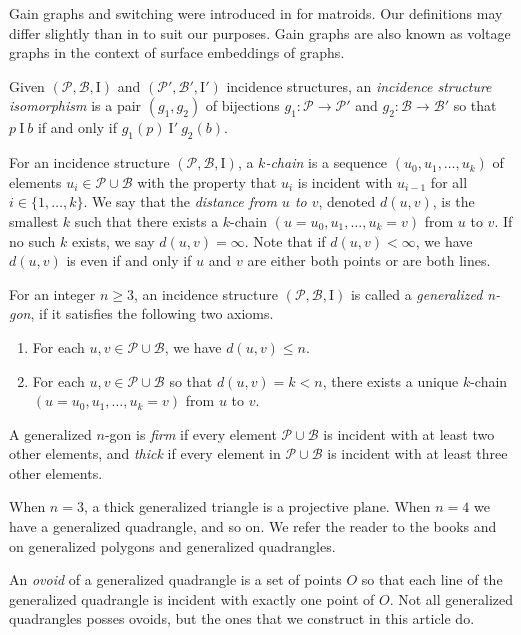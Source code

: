 \documentclass[11pt]{article}
\theoremstyle{definition}
\begin{document}
Gain graphs and switching were introduced in \cite{Zas89} for matroids.  Our definitions may differ slightly than in \cite{Zas89} to suit our purposes.  Gain graphs are also known as voltage graphs in the context of surface embeddings of graphs.

Given $(\mathscr{P},\mathscr{B},\mathrm{I})$ and $(\mathscr{P}',\mathscr{B}',\mathrm{I}')$ incidence structures, an \textit{incidence structure isomorphism} is a pair $(g_1,g_2)$ of bijections $g_1 : \mathscr{P} \rightarrow \mathscr{P}'$ and $g_2 : \mathscr{B} \rightarrow \mathscr{B}'$ so that $p \  \mathrm{I} \  b$ if and only if $g_1(p) \  \mathrm{I}' \  g_2(b)$.

For an incidence structure $(\mathscr{P},\mathscr{B},\mathrm{I})$, a $k$\textit{-chain} is a sequence $(u_0, u_1, \dots, u_k)$ of elements $u_i \in \mathscr{P} \cup \mathscr{B}$ with the property that $u_i$ is incident with $u_{i-1}$ for all $i \in \{1, \dots,  k\}$.  We say that the \textit{distance from $u$ to $v$}, denoted $d(u,v)$, is the smallest $k$ such that there exists a $k$-chain $(u = u_0, u_1, \dots, u_k = v)$ from $u$ to $v$.  If no such $k$ exists, we say $d(u,v) = \infty$.  Note that if $d(u,v) < \infty$, we have $d(u,v)$ is even if and only if $u$ and $v$ are either both points or are both lines.

For an integer $n \geq 3$, an incidence structure $(\mathscr{P},\mathscr{B},\mathrm{I})$ is called a \textit{generalized n-gon}, if it satisfies the following two axioms.
\begin{enumerate}
 \item For each $u,v \in \mathscr{P} \cup \mathscr{B}$, we have $d(u,v) \leq n$.
\item For each $u,v \in \mathscr{P} \cup \mathscr{B}$ so that $d(u,v) = k < n$, there exists a unique $k$-chain $(u = u_0,u_1, \dots , u_k = v)$ from $u$ to $v$.
\end{enumerate}

A generalized $n$-gon is \textit{firm} if every element $\mathscr{P} \cup \mathscr{B}$ is incident with at least two other elements, and \textit{thick} if every element in $\mathscr{P} \cup \mathscr{B}$ is incident with at least three other elements. 

When $n=3$, a thick generalized triangle is a projective plane.  When $n=4$ we have a generalized quadrangle, and so on.   We refer the reader to the books \cite{PolyBook} and \cite{GQBook} on generalized polygons and generalized quadrangles.

An \textit{ovoid} of a generalized quadrangle is a set of points $O$ so that each line of the generalized quadrangle is incident with exactly one point of $O$.  Not all generalized quadrangles posses ovoids, but the ones that we construct in this article do.
\end{document}
